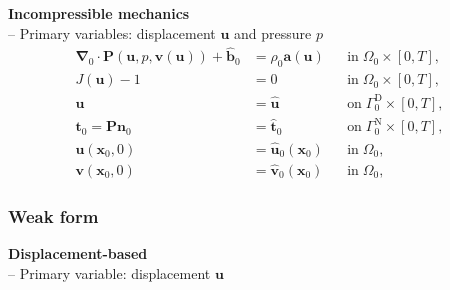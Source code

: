 \documentclass[a4paper,12pt]{report}
\newcommand{\bs}[1]{\boldsymbol{#1}}
\newcommand{\Om}{\mathit{\Omega}}
\newcommand{\Gm}{\mathit{\Gamma}}
\begin{document}
\textbf{Incompressible mechanics}\\

-- Primary variables: displacement $\bs{u}$ and pressure $p$
\begin{equation}
\label{equation-solid-strong-form-inc}
\begin{aligned}
\bs{\nabla}_{0} \cdot \bs{P}(\bs{u},p,\bs{v}(\bs{u})) + \hat{\bs{b}}_{0} &= \rho_{0} \bs{a}(\bs{u}) &&\text{in} \; \mathit{\Omega}_{0} \times [0, T], \\
J(\bs{u})-1 &= 0 &&\text{in} \; \mathit{\Omega}_{0} \times [0, T], \\
\bs{u} &= \hat{\bs{u}} &&\text{on} \; \mathit{\Gamma}_{0}^{\mathrm{D}} \times [0, T],\\
\bs{t}_{0} = \bs{P}\bs{n}_{0} &= \hat{\bs{t}}_{0} &&\text{on} \; \mathit{\Gm}_{0}^{\mathrm{N}} \times [0, T],\\
\bs{u}(\bs{x}_{0},0) &= \hat{\bs{u}}_{0}(\bs{x}_{0}) &&\text{in} \; \mathit{\Om}_{0},\\
\bs{v}(\bs{x}_{0},0) &= \hat{\bs{v}}_{0}(\bs{x}_{0}) &&\text{in} \; \mathit{\Om}_{0},
\end{aligned}
\end{equation}

\subsubsection{Weak form}

\textbf{Displacement-based}\\

-- Primary variable: displacement $\bs{u}$\\
\end{document}
